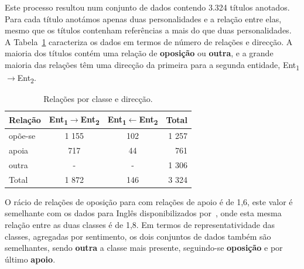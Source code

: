 \documentclass[a4paper, twocolumn, 11pt, twoside]{article}
\begin{document}
Este processo resultou num conjunto de dados contendo 3.324 títulos anotados. Para cada título anotámos apenas duas personalidades e a relação entre elas, mesmo que os títulos contenham referências a mais do que duas personalidades. A Tabela~\ref{tab:rel_dataset} caracteriza os dados em termos de número de relações e direcção. A maioria dos títulos contém uma relação de \textbf{oposição} ou \textbf{outra}, e a grande maioria das relações têm uma direcção da primeira para a segunda entidade, Ent\textsubscript{1}$\rightarrow$Ent\textsubscript{2}.


\begin{table}[!h]
    \begin{center}
    \begin{tabular}{l ccr}
        {\bf Relação} & {\bf \footnotesize{Ent\textsubscript{1}$\rightarrow$Ent\textsubscript{2}}} & {\bf \footnotesize{Ent\textsubscript{1}$\leftarrow$Ent\textsubscript{2}}} & {\bf Total} \\
        \hline
        opõe-se          &  1 155  &  102  &  1 257  \\
        apoia            &    717  &   44  &    761  \\
        outra            &    -    &   -   &  1 306  \\
		\hline
		Total			 &  1 872  &  146  &  3 324  \\
    \end{tabular}
	\caption{Relações por classe e direcção.}
	\label{tab:rel_dataset}
	\end{center}
\end{table}

O rácio de relações de oposição para com relações de apoio é de 1,6, este valor é semelhante com os dados para Inglês disponibilizados por~\cite{park-etal-2021-blames}, onde esta mesma relação entre as duas classes é de 1,8.  Em termos de representatividade das classes, agregadas por sentimento, os dois conjuntos de dados também são semelhantes, sendo \textbf{outra} a classe mais presente, seguindo-se \textbf{oposição} e por último \textbf{apoio}.


\end{document}
